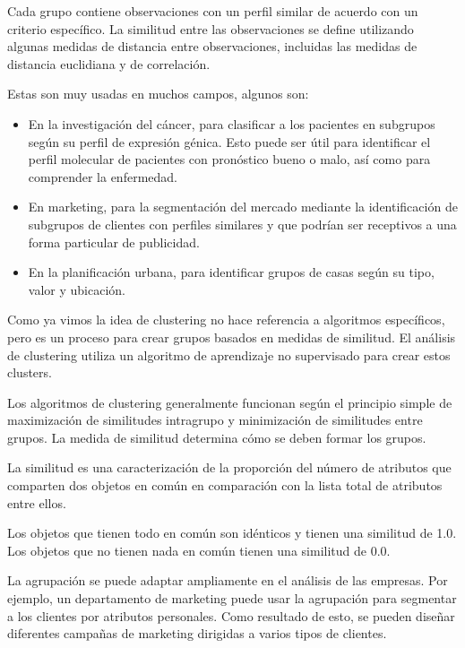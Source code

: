 \documentclass[12pt, fleqn]{report}                             %
\theoremstyle{break}                                            %
\begin{document}
        Cada grupo contiene observaciones con un perfil similar de acuerdo con un criterio específico. 
        La similitud entre las observaciones se define utilizando algunas medidas de distancia entre observaciones, 
        incluidas las medidas de distancia euclidiana y de correlación.

        Estas son muy usadas en muchos campos, algunos son:
        \begin{itemize}
            \item En la investigación del cáncer, para clasificar a los pacientes en subgrupos según su 
            perfil de expresión génica. Esto puede ser útil para identificar el perfil molecular de 
            pacientes con pronóstico bueno o malo, así como para comprender la enfermedad.
            
            \item 
            En marketing, para la segmentación del mercado mediante la identificación de subgrupos de 
            clientes con perfiles similares y que podrían ser receptivos a una forma particular de publicidad.

            \item 
                En la planificación urbana, para identificar grupos de casas según su tipo, valor y ubicación.
        \end{itemize}

        Como ya vimos la idea de clustering no hace referencia a algoritmos específicos, 
        pero es un proceso para crear grupos basados en medidas de similitud. 
        El análisis de clustering utiliza un algoritmo de aprendizaje no supervisado para crear estos clusters.

        Los algoritmos de clustering generalmente funcionan según el principio simple de maximización 
        de similitudes intragrupo y minimización de similitudes entre grupos. 
        La medida de similitud determina cómo se deben formar los grupos.

        La similitud es una caracterización de la proporción del número de atributos que 
        comparten dos objetos en común en comparación con la lista total de atributos entre ellos. 
        
        Los objetos que tienen todo en común son idénticos y tienen una similitud de 1.0. 
        Los objetos que no tienen nada en común tienen una similitud de 0.0.

        La agrupación se puede adaptar ampliamente en el análisis de las empresas. 
        Por ejemplo, un departamento de marketing puede usar la agrupación para segmentar 
        a los clientes por atributos personales. Como resultado de esto, 
        se pueden diseñar diferentes campañas de marketing dirigidas a varios tipos de clientes.
\end{document}
